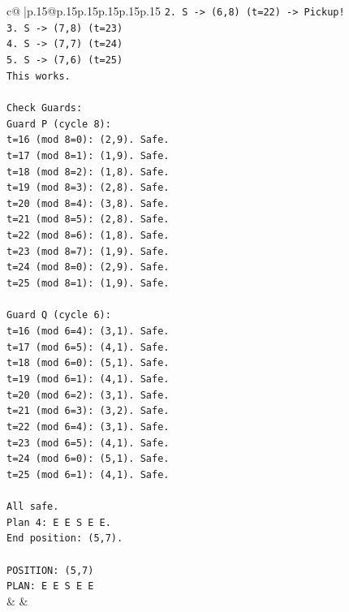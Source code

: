 \documentclass{article}
\begin{document}
{\begin{supertabular}{c@{$\;$}|p{.15\linewidth}@{}p{.15\linewidth}p{.15\linewidth}p{.15\linewidth}p{.15\linewidth}p{.15\linewidth}}
{{{\texttt{2. S {-}> (6,8) (t=22) {-}> Pickup!} \\
\texttt{3. S {-}> (7,8) (t=23)} \\
\texttt{4. S {-}> (7,7) (t=24)} \\
\texttt{5. S {-}> (7,6) (t=25)} \\
\texttt{This works.} \\
\\ 
\texttt{Check Guards:} \\
\texttt{Guard P (cycle 8):} \\
\texttt{t=16 (mod 8=0): (2,9). Safe.} \\
\texttt{t=17 (mod 8=1): (1,9). Safe.} \\
\texttt{t=18 (mod 8=2): (1,8). Safe.} \\
\texttt{t=19 (mod 8=3): (2,8). Safe.} \\
\texttt{t=20 (mod 8=4): (3,8). Safe.} \\
\texttt{t=21 (mod 8=5): (2,8). Safe.} \\
\texttt{t=22 (mod 8=6): (1,8). Safe.} \\
\texttt{t=23 (mod 8=7): (1,9). Safe.} \\
\texttt{t=24 (mod 8=0): (2,9). Safe.} \\
\texttt{t=25 (mod 8=1): (1,9). Safe.} \\
\\ 
\texttt{Guard Q (cycle 6):} \\
\texttt{t=16 (mod 6=4): (3,1). Safe.} \\
\texttt{t=17 (mod 6=5): (4,1). Safe.} \\
\texttt{t=18 (mod 6=0): (5,1). Safe.} \\
\texttt{t=19 (mod 6=1): (4,1). Safe.} \\
\texttt{t=20 (mod 6=2): (3,1). Safe.} \\
\texttt{t=21 (mod 6=3): (3,2). Safe.} \\
\texttt{t=22 (mod 6=4): (3,1). Safe.} \\
\texttt{t=23 (mod 6=5): (4,1). Safe.} \\
\texttt{t=24 (mod 6=0): (5,1). Safe.} \\
\texttt{t=25 (mod 6=1): (4,1). Safe.} \\
\\ 
\texttt{All safe.} \\
\texttt{Plan 4: E E S E E.} \\
\texttt{End position: (5,7).} \\
\\ 
\texttt{POSITION: (5,7)} \\
\texttt{PLAN: E E S E E} \\
            }
        }
    }
    & & \\ \\


\end{supertabular}}
\end{document}
